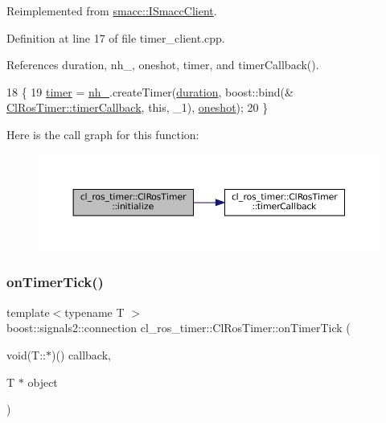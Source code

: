 Reimplemented from \hyperlink{classsmacc_1_1ISmaccClient_a974ebb6ad6cf812e7b9de6b78b3d901f}{smacc\+::\+I\+Smacc\+Client}.



Definition at line 17 of file timer\+\_\+client.\+cpp.



References duration, nh\+\_\+, oneshot, timer, and timer\+Callback().


\begin{DoxyCode}
18 \{
19     \hyperlink{classcl__ros__timer_1_1ClRosTimer_a50237ecbf49b178b9d109b25ba768f5a}{timer} = \hyperlink{classcl__ros__timer_1_1ClRosTimer_a37b156a2fc18f04891aa4cb63c8d41b9}{nh\_}.createTimer(\hyperlink{classcl__ros__timer_1_1ClRosTimer_a39a5666044409eca94562fcceca8b0ea}{duration}, boost::bind(&
      \hyperlink{classcl__ros__timer_1_1ClRosTimer_a047720c2f37e354e0867b148c85e18e3}{ClRosTimer::timerCallback}, \textcolor{keyword}{this}, \_1), \hyperlink{classcl__ros__timer_1_1ClRosTimer_a07ce4ac2560aa7ad4b5dee233f2d7733}{oneshot});
20 \}
\end{DoxyCode}
Here is the call graph for this function\+:
\nopagebreak
\begin{figure}[H]
\begin{center}
\leavevmode
\includegraphics[width=350pt]{classcl__ros__timer_1_1ClRosTimer_a874e97a9e3e974966ac4999e0a293e73_cgraph}
\end{center}
\end{figure}
\mbox{\label{classcl__ros__timer_1_1ClRosTimer_a7edcc057bfb5a25fe0892755137dd8da}} 
\subsubsection{\texorpdfstring{on\+Timer\+Tick()}{onTimerTick()}}
{\footnotesize\ttfamily template$<$typename T $>$ \\
boost\+::signals2\+::connection cl\+\_\+ros\+\_\+timer\+::\+Cl\+Ros\+Timer\+::on\+Timer\+Tick (\begin{DoxyParamCaption}\item[{void(T\+::$\ast$)()}]{callback,  }\item[{T $\ast$}]{object }\end{DoxyParamCaption})\hspace{0.3cm}{\ttfamily [inline]}}



